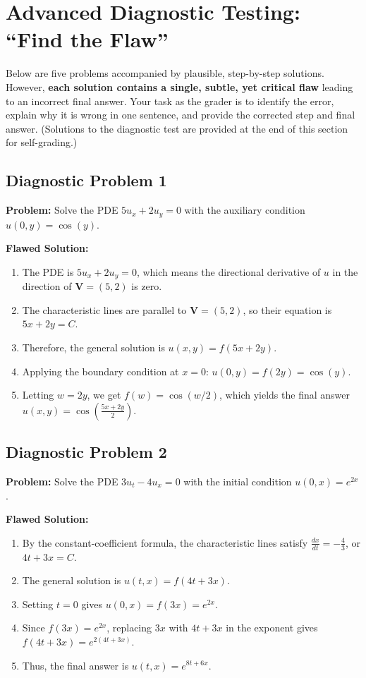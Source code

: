 \documentclass[11pt]{article}
\begin{document}
\section{Advanced Diagnostic Testing: ``Find the Flaw''}

Below are five problems accompanied by plausible, step-by-step solutions. However, \textbf{each solution contains a single, subtle, yet critical flaw} leading to an incorrect final answer. Your task as the grader is to identify the error, explain why it is wrong in one sentence, and provide the corrected step and final answer. (Solutions to the diagnostic test are provided at the end of this section for self-grading.)

\subsection*{Diagnostic Problem 1}
\textbf{Problem:} Solve the PDE $5u_x + 2u_y = 0$ with the auxiliary condition $u(0, y) = \cos(y)$.

\noindent\textbf{Flawed Solution:}
\begin{enumerate}
    \item The PDE is $5u_x + 2u_y = 0$, which means the directional derivative of $u$ in the direction of $\mathbf{V} = (5, 2)$ is zero.
    \item The characteristic lines are parallel to $\mathbf{V} = (5, 2)$, so their equation is $5x + 2y = C$.
    \item Therefore, the general solution is $u(x, y) = f(5x + 2y)$.
    \item Applying the boundary condition at $x = 0$: $u(0, y) = f(2y) = \cos(y)$.
    \item Letting $w = 2y$, we get $f(w) = \cos(w/2)$, which yields the final answer $u(x, y) = \cos\left(\frac{5x + 2y}{2}\right)$.
\end{enumerate}

\subsection*{Diagnostic Problem 2}
\textbf{Problem:} Solve the PDE $3u_t - 4u_x = 0$ with the initial condition $u(0, x) = e^{2x}$.

\noindent\textbf{Flawed Solution:}
\begin{enumerate}
    \item By the constant-coefficient formula, the characteristic lines satisfy $\frac{dx}{dt} = -\frac{4}{3}$, or $4t + 3x = C$.
    \item The general solution is $u(t, x) = f(4t + 3x)$.
    \item Setting $t = 0$ gives $u(0, x) = f(3x) = e^{2x}$.
    \item Since $f(3x) = e^{2x}$, replacing $3x$ with $4t + 3x$ in the exponent gives $f(4t + 3x) = e^{2(4t + 3x)}$.
    \item Thus, the final answer is $u(t, x) = e^{8t + 6x}$.
\end{enumerate}
\end{document}
